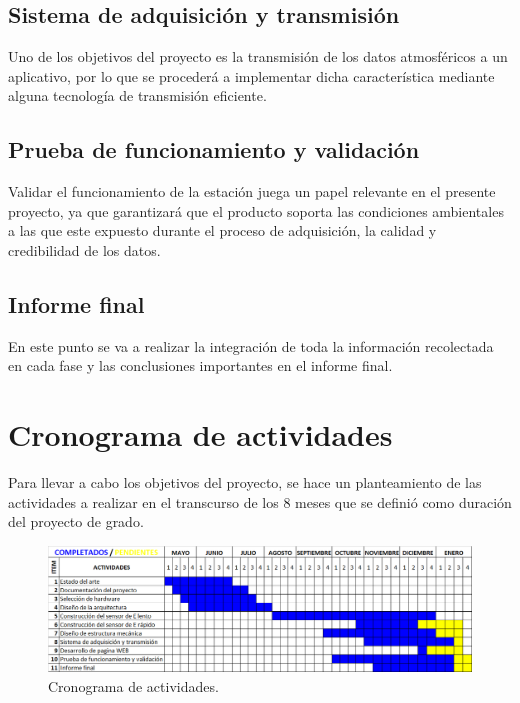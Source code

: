 \documentclass[12pt,a4paper,oneside]{book}
\begin{document}
\section{\textbf{Sistema de adquisición y transmisión
}}
Uno de los objetivos del proyecto es la transmisión de los datos atmosféricos a un aplicativo, por lo que se procederá a implementar dicha característica mediante alguna tecnología de transmisión eficiente.


\section{\textbf{Prueba de funcionamiento y validación
}}
Validar el funcionamiento de la estación juega un papel relevante en el presente proyecto, ya que garantizará que el producto soporta las condiciones ambientales a las que este expuesto durante el proceso de adquisición, la calidad y credibilidad de los datos. 

\section{\textbf{Informe final
}}
En este punto se va a realizar la integración de toda la información recolectada en cada fase y las conclusiones importantes en el informe final. 

 
\newpage 

\chapter{Cronograma de actividades}
Para llevar a cabo los objetivos del proyecto, se hace un planteamiento de las actividades a realizar en el transcurso de los 8 meses que se definió como duración del proyecto de grado.

\begin{figure}[ht]
  \centering
  \includegraphics[width=1.1\columnwidth]{cronograma.png}
  \caption{Cronograma de actividades.}
\end{figure}
\end{document}
